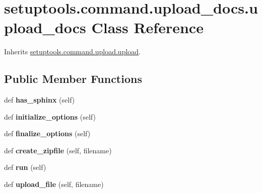 \hypertarget{classsetuptools_1_1command_1_1upload__docs_1_1upload__docs}{}\section{setuptools.\+command.\+upload\+\_\+docs.\+upload\+\_\+docs Class Reference}
\label{classsetuptools_1_1command_1_1upload__docs_1_1upload__docs}


Inherits \hyperlink{classsetuptools_1_1command_1_1upload_1_1upload}{setuptools.\+command.\+upload.\+upload}.

\subsection*{Public Member Functions}
\begin{DoxyCompactItemize}
\item 
\mbox{\label{classsetuptools_1_1command_1_1upload__docs_1_1upload__docs_a0528a4c1dba343caf760a1f367028d8e}} 
def {\bfseries has\+\_\+sphinx} (self)
\item 
\mbox{\label{classsetuptools_1_1command_1_1upload__docs_1_1upload__docs_a2f63bded4d91b7eb5c9dc81948ebf223}} 
def {\bfseries initialize\+\_\+options} (self)
\item 
\mbox{\label{classsetuptools_1_1command_1_1upload__docs_1_1upload__docs_a2f93575b3f6bd2e6bacacf184b8ab39e}} 
def {\bfseries finalize\+\_\+options} (self)
\item 
\mbox{\label{classsetuptools_1_1command_1_1upload__docs_1_1upload__docs_ab3f3f728f7f90d6e4ff47f2633575ef0}} 
def {\bfseries create\+\_\+zipfile} (self, filename)
\item 
\mbox{\label{classsetuptools_1_1command_1_1upload__docs_1_1upload__docs_a68a4acfc4c983b959a33ef16a9c00f1b}} 
def {\bfseries run} (self)
\item 
\mbox{\label{classsetuptools_1_1command_1_1upload__docs_1_1upload__docs_ac346b23de37dcf9fbaa40c548f68321c}} 
def {\bfseries upload\+\_\+file} (self, filename)
\end{DoxyCompactItemize}
